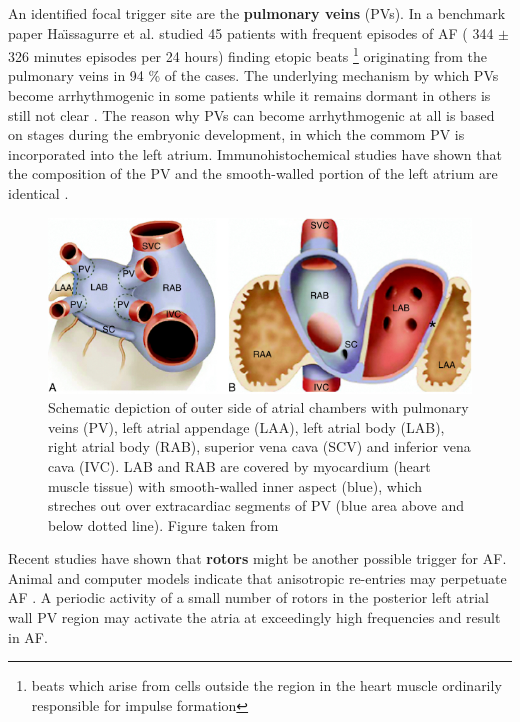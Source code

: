 \documentclass[type=dr, dr=rernat, accentcolor=tud7b,colorbacktitle, bigchapter, openright, twoside, 12pt ]{tudthesis}
\begin{document}
An identified focal trigger site are the \textbf{pulmonary veins} (PVs). In a benchmark paper Ha\"{\i}ssagurre et al. \cite{Hai98} studied 45 patients with frequent episodes of AF ( 344 $\pm$ 326 minutes episodes per 24 hours) finding etopic beats \footnote{beats which arise from cells outside the region in the heart muscle ordinarily responsible for impulse formation} originating from the pulmonary veins in 94 \% of the cases. The underlying mechanism by which PVs become arrhythmogenic in some patients while it remains dormant in others is still not clear \cite{CE09}. The reason why PVs can become arrhythmogenic at all is based on stages during the embryonic development, in which the commom PV is incorporated into the left atrium. Immunohistochemical studies have shown that the composition of the PV and the smooth-walled portion of the left atrium are identical \cite{CE09} \cite{Dou06}. 

\begin{figure}[H]
\begin{center}
\includegraphics[scale=4.0]{PVatriumTissue.png}
\caption{Schematic depiction of outer side of atrial chambers with pulmonary veins (PV), left atrial appendage (LAA), left atrial body (LAB), right atrial body (RAB), superior vena cava (SCV) and inferior vena cava (IVC). LAB and RAB are covered by myocardium (heart muscle tissue) with smooth-walled inner aspect (blue), which streches out over extracardiac segments of PV (blue area above and below dotted line). Figure taken from \cite{Dou06}}
\end{center}
\end{figure}

Recent studies have shown that \textbf{rotors} might be another possible trigger for AF. Animal and computer models indicate that anisotropic re-entries may perpetuate AF \cite{Jal03}. A periodic activity of a small number of rotors in the posterior left atrial wall PV region may activate the atria at exceedingly high frequencies and result in AF.\newline
\end{document}
